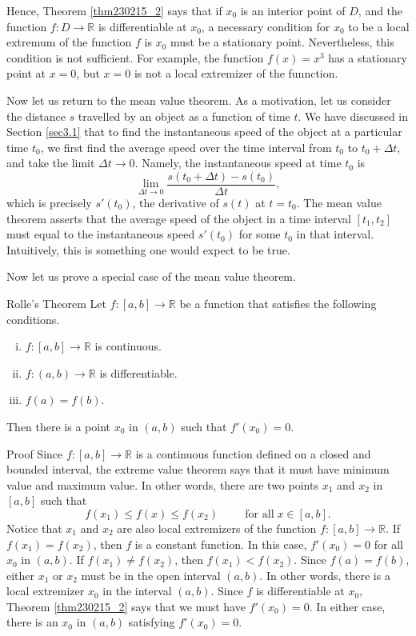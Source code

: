Hence, Theorem \ref{thm230215_2} says that if $x_0$ is an interior point of $D$, and the function $f:D\to\mathbb{R}$ is differentiable at $x_0$, a necessary condition for $x_0$ to be a local extremum of the function $f$ is $x_0$ must be a stationary point.
Nevertheless, this condition is not sufficient. For example, the function $f(x)=x^3$ has a stationary point at $x=0$, but $x=0$ is not a local extremizer of the funnction.

Now let us return to the mean value theorem. 
As a motivation, let us consider the distance $s$ travelled by an object as a function of time $t$. We have discussed in Section \ref{sec3.1} that to find the instantaneous speed of the object at a particular time $t_0$, we first find the average speed over the time interval from $t_0$ to $t_0+\Delta t$, and take the limit  $\Delta t\to 0$. Namely, the instantaneous speed at time $t_0$ is
\[\lim_{\Delta t\to 0}\frac{s(t_0+\Delta t)-s(t_0)}{\Delta t},\] which is precisely $s'(t_0)$, the derivative of $s(t)$ at $t=t_0$. The mean value theorem asserts that the average speed of the object in a time interval $[t_1, t_2]$ must equal to the instantaneous speed $s'(t_0)$ for some $t_0$ in that interval. Intuitively, this is something one would expect to be true.

Now let us prove a special case of the mean value theorem.
\begin{theorem}[label=thm_Rolles]{Rolle's Theorem}
Let $f:[a,b]\to\mathbb{R}$ be a function that satisfies the following conditions.
\begin{enumerate}[(i)]
\item $f:[a,b]\to\mathbb{R}$ is continuous.
\item $f:(a, b)\to\mathbb{R}$ is differentiable.
\item $f(a)=f(b)$.
\end{enumerate}
Then there is a point $x_0$ in $(a, b)$ such that $f'(x_0)=0$. 
\end{theorem}
\begin{myproof}{Proof}
Since $f:[a,b]\to\mathbb{R}$ is a continuous function defined on a closed and bounded interval, the extreme value theorem says that it must have minimum value and maximum value. In other words, there are two points $x_1$ and $x_2$ in  $[a,b]$ such that
\[f(x_1)\leq f(x)\leq f(x_2)\hspace{1cm}\text{for all}\;x\in [a,b].\] Notice that $x_1$ and $x_2$ are also local extremizers of the function $f:[a,b]\to\mathbb{R}$.
If $f(x_1)=f(x_2)$, then $f$ is a constant function. In this case,  $f'(x_0)=0$ for all $x_0$ in $(a, b)$.
If $f(x_1)\neq f(x_2)$, then $f(x_1)<f(x_2)$. Since $f(a)=f(b)$, either $x_1$ or $x_2$ must be in the open interval $(a, b)$. In other words, there is a local extremizer $x_0$ in the interval $(a,b)$. Since $f$ is differentiable at $x_0$, Theorem \ref{thm230215_2}  says that we must have $f'(x_0)=0$.
In either case,   there is an $x_0$ in $(a, b)$ satisfying $f'(x_0)=0$.
\end{myproof}


